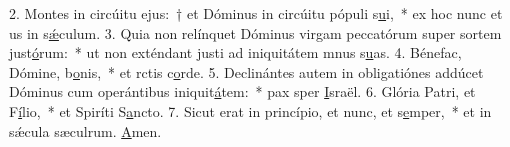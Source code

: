 2. Montes in circúitu ejus:~† et Dóminus in circúitu pópuli s\uline{u}i,~* ex hoc nunc et us in s\uline{ǽ}culum.
3. Quia non relínquet Dóminus virgam peccatórum super sortem just\uline{ó}rum:~* ut non exténdant justi ad iniquitátem mnus s\uline{u}as.
4. Bénefac, Dómine, b\uline{o}nis,~* et rctis c\uline{o}rde.
5. Declinántes autem in obligatiónes addúcet Dóminus cum operántibus iniquit\uline{á}tem:~* pax sper \uline{I}sraël.
6. Glória Patri, et F\uline{í}lio,~* et Spiríti S\uline{a}ncto.
7. Sicut erat in princípio, et nunc, et s\uline{e}mper,~* et in sǽcula sæculrum. \uline{A}men.
